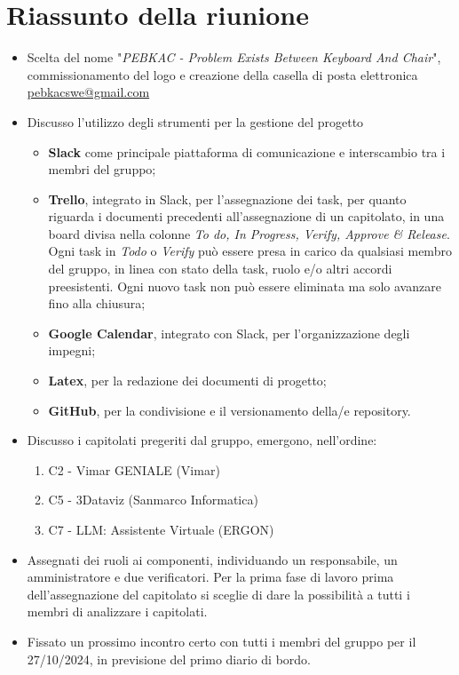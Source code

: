 \section{Riassunto della riunione}
\begin{itemize}
    \item Scelta del nome "\textit{PEBKAC - Problem Exists Between Keyboard And Chair}", commissionamento del logo e creazione della casella di posta elettronica \href{mailto:pebkacswe@gmail.com}{pebkacswe@gmail.com}
  \item Discusso  l'utilizzo degli strumenti per la gestione del progetto
  \begin{itemize}
    \item \textbf{Slack} come principale piattaforma di comunicazione e interscambio tra i membri del gruppo;
    \item \textbf{Trello}, integrato in Slack, per l'assegnazione dei task,  per quanto riguarda i documenti precedenti all'assegnazione di un capitolato, in una board divisa nella colonne \textit{To do, In Progress, Verify, Approve \& Release}. Ogni task in \textit{Todo} o \textit{Verify} può essere presa in carico da qualsiasi membro del gruppo, in linea con stato della task, ruolo e/o altri accordi preesistenti. Ogni nuovo task non può essere eliminata ma solo avanzare fino alla chiusura;
    \item \textbf{Google Calendar}, integrato con Slack, per l'organizzazione degli impegni;
    \item \textbf{Latex}, per la redazione dei documenti di progetto;
  \item \textbf{GitHub}, per la condivisione e il versionamento della/e repository.
  \end{itemize}
    \item Discusso i capitolati pregeriti dal gruppo, emergono, nell'ordine:
    \begin{enumerate}
        \item C2 - Vimar GENIALE (Vimar)
        \item C5 - 3Dataviz (Sanmarco Informatica)
        \item C7 - LLM: Assistente Virtuale (ERGON)
    \end{enumerate}
  \item Assegnati dei ruoli ai componenti, individuando un responsabile, un amministratore e due verificatori. Per la prima fase di lavoro prima dell'assegnazione del capitolato si sceglie di dare la possibilità a tutti i membri di analizzare i capitolati.
  \item Fissato un prossimo incontro certo con tutti i membri del gruppo per il 27/10/2024, in previsione del primo diario di bordo.
  

\end{itemize}